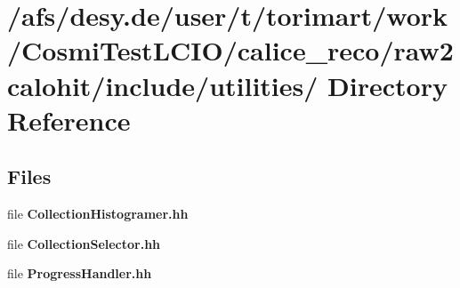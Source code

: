 \section{/afs/desy.de/user/t/torimart/work/CosmiTestLCIO/calice\_\-reco/raw2calohit/include/utilities/ Directory Reference}
\label{dir_e8503e0934da5275ab191b3f3827cdf0}
\subsection*{Files}
\begin{DoxyCompactItemize}
\item 
file {\bfseries CollectionHistogramer.hh}
\item 
file {\bfseries CollectionSelector.hh}
\item 
file {\bfseries ProgressHandler.hh}
\end{DoxyCompactItemize}
